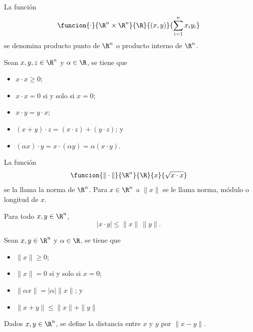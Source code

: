 \documentclass[a4,11pt]{aleph-notas}
\begin{document}
\begin{defi}
    La función 
    \[
        \funcion{\cdot}{\R^n\times \R^n}{\R}
        {(x,y)}{\sum_{i=1}^n x_iy_i}
    \]
    se denomina producto punto de $\R^n$ o producto interno de $\R^n$.
\end{defi}

\begin{teo}
    Sean $x,y,z\in \R^n$ y $\alpha\in\R$, se tiene que
    \begin{itemize}
    \item
        $x\cdot x \geq 0$;
    \item
        $x\cdot x = 0$ si y solo si $x=0$;
    \item
        $x \cdot y = y \cdot x$;
    \item 
        $(x + y)\cdot z = (x\cdot z) + (y\cdot z)$; y
    \item
        $(\alpha x)\cdot y = x\cdot(\alpha y) = \alpha(x\cdot y)$.
    \end{itemize}
\end{teo}

\begin{defi}[Norma]
    La función
    \[
        \funcion{\|\cdot\|}{\R^n}{\R}
        {x}{\sqrt{x\cdot x}}
    \]
   se la llama la norma de $\R^n$. Para $x\in\R^n$ a $\|x\|$ se le llama norma, módulo o longitud de $x$.
\end{defi}





\begin{teo}
    Para todo $x,y\in\R^n$,
    \[
        |x\cdot y|\leq \|x\|\,\|y\|.
    \]
\end{teo}

\begin{teo}
    Sean $x,y\in \R^n$ y $\alpha\in\R$, se tiene que
    \begin{itemize}
    \item
        $\|x\| \geq 0$;
    \item
        $\|x\| = 0$ si y solo si $x=0$;
    \item 
        $\|\alpha x\| = |\alpha|\|x\|$; y
    \item
        $\|x + y\| \leq \|x\|+\|y\|$
    \end{itemize}
\end{teo}

\begin{advertencia}
    Dados $x,y\in\R^n$, se define la distancia entre $x$ y $y$ por $\|x-y\|$.
\end{advertencia}
\end{document}
